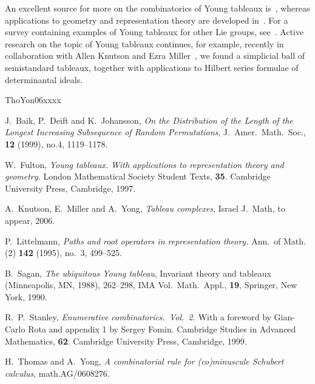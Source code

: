 \documentclass[12pt,dvips]{amsart}
\theoremstyle{remark}
\theoremstyle{plain}
\begin{document}
An excellent source for more on the combinatorics of
Young tableaux is~\cite{Stanley}, whereas applications to 
geometry and representation theory are developed 
in~\cite{Fulton}. For a survey containing examples of Young tableaux
for other Lie groups, see~\cite{Sagan}. 
Active research on the topic of Young tableaux
continues, for example, recently in collaboration
with Allen Knutson and Ezra Miller~\cite{Knutson.Miller.Yong}, 
we found 
a simplicial ball of semistandard tableaux, 
together with applications to Hilbert series formulae of 
determinantal ideals.

\begin{thebibliography}{ThoYon06xxxx}

J.~Baik, P.~Deift and K.~Johansson, 
\emph{On the Distribution of the Length of the Longest Increasing Subsequence of Random Permutations}, J.~Amer.~Math.~Soc., {\bf 12} (1999), no.4, 1119--1178.

W.~Fulton, \emph{Young tableaux. With applications to representation theory and geometry.} London Mathematical Society Student Texts, {\bf 35}. 
Cambridge University Press, Cambridge, 1997.

A.~Knutson, E.~Miller and A.~Yong, \emph{Tableau complexes}, Israel J.~Math, 
to appear, 2006.

P.~Littelmann, \emph{Paths and root operators in representation theory.}
Ann.~of Math. (2) {\bf 142} (1995), no.~3, 499--525.


B.~Sagan, \emph{The ubiquitous Young tableau},
Invariant theory and tableaux (Minneapolis, MN, 1988),  262--298,
IMA Vol.~Math.~Appl., {\bf 19}, Springer, New York, 1990.

R.~P.~Stanley, \emph{Enumerative combinatorics.~Vol.~2.} 
With a foreword by Gian-Carlo Rota and appendix 1 by Sergey Fomin. 
Cambridge Studies in Advanced Mathematics, {\bf 62}. 
Cambridge University Press, Cambridge, 1999.

H.~Thomas and A.~Yong, \emph{A combinatorial rule for (co)minuscule
Schubert calculus}, \textsf{math.AG/0608276}.

\end{thebibliography}
\end{document}
